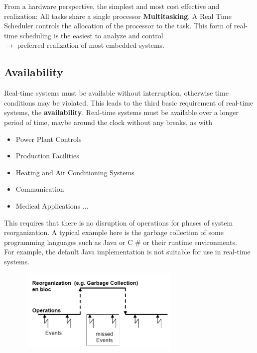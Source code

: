 From a hardware perspective, the simplest and most cost effective and realization: All tasks share a single processor \textbf{Multitasking}. A Real Time Scheduler controls the allocation of the processor to the task. This form of real-time scheduling is the easiest to analyze and control \\ 

$\rightarrow$ preferred realization of most embedded systems.

\subsection{Availability}

Real-time systems must be available without interruption, otherwise time conditions may be violated. This leads to the third basic requirement of real-time systems, the \textbf{availability}. Real-time systems must be available over a longer period of time, maybe around the clock without any breaks, as with

\begin{itemize}
	\item  Power Plant Controls
	\item  Production Facilities
	\item  Heating and Air Conditioning Systems
	\item  Communication
	\item  Medical Applications ...
\end{itemize}

This requires that there is no disruption of operations for phases of system reorganization. A typical example here is the garbage collection of some programming languages such as Java or C \# or their runtime environments. \\

For example, the default Java implementation is not suitable for use in real-time systems. 

	\begin{figure}[h]
    \centering
    \includegraphics[width=8cm, height=4cm]{Images/image71.png}
    \label{fig:Fig 17}
    \end{figure}

